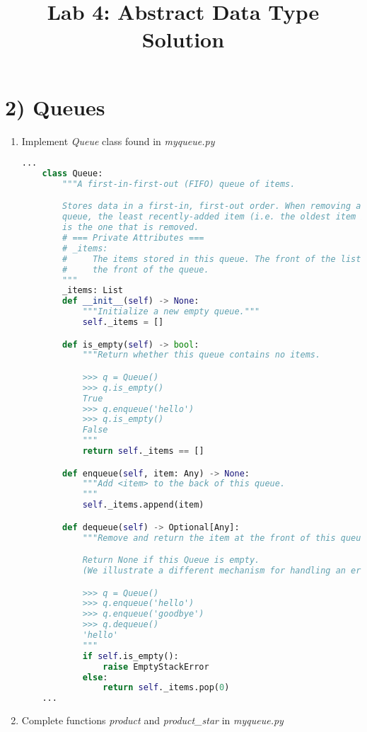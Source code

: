 \documentclass[12pt]{article}
\begin{document}
\title{Lab 4: Abstract Data Type Solution}
\date{}
\maketitle

\section*{2) Queues}
\begin{enumerate}[1.]
    \item Implement \textit{Queue} class found in \textit{myqueue.py}

    \begin{lstlisting}[language=Python,caption={task\_2\_q1\_solution.py},captionpos=b]
    ...
    class Queue:
        """A first-in-first-out (FIFO) queue of items.

        Stores data in a first-in, first-out order. When removing an item from the
        queue, the least recently-added item (i.e. the oldest item in the Queue)
        is the one that is removed.
        # === Private Attributes ===
        # _items:
        #     The items stored in this queue. The front of the list represents
        #     the front of the queue.
        """
        _items: List
        def __init__(self) -> None:
            """Initialize a new empty queue."""
            self._items = []

        def is_empty(self) -> bool:
            """Return whether this queue contains no items.

            >>> q = Queue()
            >>> q.is_empty()
            True
            >>> q.enqueue('hello')
            >>> q.is_empty()
            False
            """
            return self._items == []

        def enqueue(self, item: Any) -> None:
            """Add <item> to the back of this queue.
            """
            self._items.append(item)

        def dequeue(self) -> Optional[Any]:
            """Remove and return the item at the front of this queue.

            Return None if this Queue is empty.
            (We illustrate a different mechanism for handling an erroneous case.)

            >>> q = Queue()
            >>> q.enqueue('hello')
            >>> q.enqueue('goodbye')
            >>> q.dequeue()
            'hello'
            """
            if self.is_empty():
                raise EmptyStackError
            else:
                return self._items.pop(0)
    ...
    \end{lstlisting}

    \item Complete functions \textit{product} and \textit{product\_star} in \textit{myqueue.py}
\end{enumerate}
\end{document}
